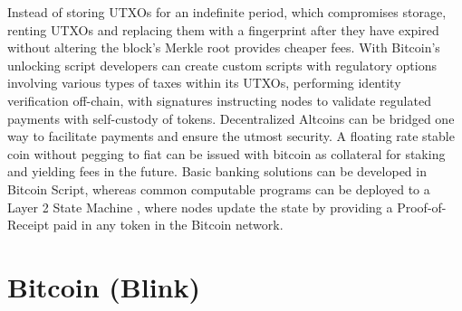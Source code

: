 \documentclass[a4paper,	10pt]{extarticle}
\begin{document}
Instead of storing UTXOs for an indefinite period, which compromises storage, renting UTXOs and replacing them with a fingerprint after they have expired without altering the block’s Merkle root provides cheaper fees. With Bitcoin’s unlocking script developers can create custom scripts with regulatory options involving various types of taxes within its UTXOs, performing identity verification off-chain, with signatures instructing nodes to validate regulated payments with self-custody of tokens. Decentralized Altcoins can be bridged one way to facilitate payments and ensure the utmost security. A floating rate stable coin \cite{stablecoin} without pegging to fiat can be issued with bitcoin as collateral for staking and yielding fees in the future. Basic banking solutions can be developed in Bitcoin Script, whereas common computable programs can be deployed to a Layer 2 State Machine \cite{wood2014ethereum}, where nodes update the state by providing a Proof-of-Receipt paid in any token in the Bitcoin network.

\section{Bitcoin (Blink)} 
\end{document}
